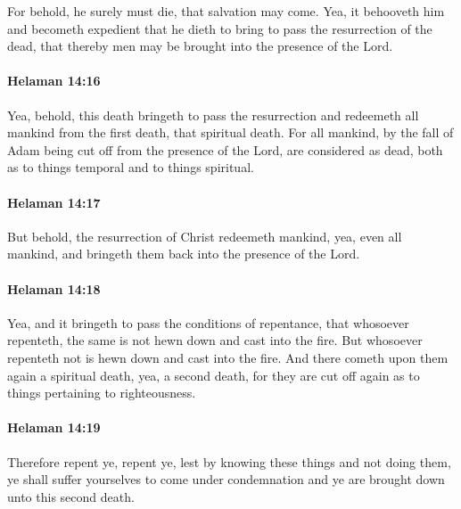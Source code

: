 			For behold, he surely must die, that salvation may come.
			Yea, it behooveth him and becometh expedient
			that he dieth to bring to pass the resurrection of the dead,
			that thereby men may be brought into the presence of the Lord.

		\paragraph{Helaman 14:16} %
			\label{HELAMAN-14-16}

			Yea, behold, this death bringeth to pass the resurrection
			and redeemeth all mankind from the first death, that spiritual death.
			For all mankind,
			by the fall of Adam being cut off from the presence of the Lord,
			are considered as dead,
			both as to things temporal and to things spiritual.

		\paragraph{Helaman 14:17} %
			\label{HELAMAN-14-17}

			But behold, the resurrection of Christ redeemeth mankind,
			yea, even all mankind,
			and bringeth them back into the presence of the Lord.

		\paragraph{Helaman 14:18} %
			\label{HELAMAN-14-18}

			Yea, and it bringeth to pass the conditions of repentance,
			that whosoever repenteth, the same is not hewn down and cast into the fire.
			But whosoever repenteth not is hewn down and cast into the fire.
			And there cometh upon them again a spiritual death,
			yea, a second death,
			for they are cut off again as to things pertaining to righteousness.

		\paragraph{Helaman 14:19} %
			\label{HELAMAN-14-19}

			Therefore repent ye, repent ye,
			lest by knowing these things and not doing them,
			ye shall suffer yourselves to come under condemnation
			and ye are brought down unto this second death.

